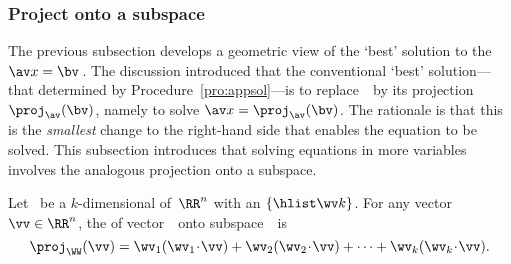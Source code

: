 





\subsubsection{Project onto a subspace}

The previous subsection develops a geometric view of the `best' solution to the  \(\av x=\bv\)\,.
The discussion introduced that the conventional `best' solution---that determined by Procedure~\ref{pro:appsol}---is to replace~\bv\ by its projection~\(\proj_{\av}(\bv)\), namely to solve \(\av x=\proj_{\av}(\bv)\).
The rationale is that this is the \emph{smallest} change to the right-hand side that enables the equation to be solved.  
This subsection introduces that solving  equations in more variables involves the analogous projection onto a subspace.



\begin{definition} \label{def:orthproj}
Let \WW\ be a \(k\)-dimensional  of~\(\RR^n\) with an  \(\{\hlist\wv k\}\).
For any vector \(\vv\in\RR^n\), the  of vector~\vv\ onto subspace~\WW\ is
\begin{equation}
\proj_\WW(\vv)=\wv_1(\wv_1\cdot\vv)+\wv_2(\wv_2\cdot\vv)+\cdots+\wv_k(\wv_k\cdot\vv).
\end{equation}
\end{definition}

